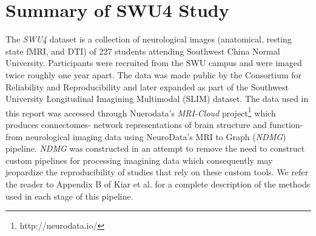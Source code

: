 \documentclass[01pt]{article}
\begin{document}
\section{Summary of SWU4 Study}

The \textit{SWU4} dataset is a collection of neurological images (anatomical, resting state fMRI, and DTI) of 227 students attending Southwest China Normal University. 
Participants were recruited from the SWU campus and were imaged twice roughly one year apart. 
The data was made public by the Consortium for Reliability and Reproducibility \cite{Zuo2014} and later expanded as part of the 
Southwest University Longitudinal Imagining Multimodal (SLIM) dataset. 
The data used in this report was accessed through Nuerodata's \textit{MRI-Cloud} project\footnote{http://neurodata.io/} which produces connectomes- network representations of brain structure and function- from neurological imaging data using NeuroData's MRI to Graph (\textit{NDMG}) pipeline. 
\textit{NDMG} was constructed in an attempt to remove the need to construct custom pipelines for processing imagining data which consequently may jeopardize the reproducibility of studies that rely on these custom tools. 
We refer the reader to Appendix B of Kiar et al.\cite{Kiar188706} for a complete description of the methods used in each stage of this pipeline.
\end{document}
